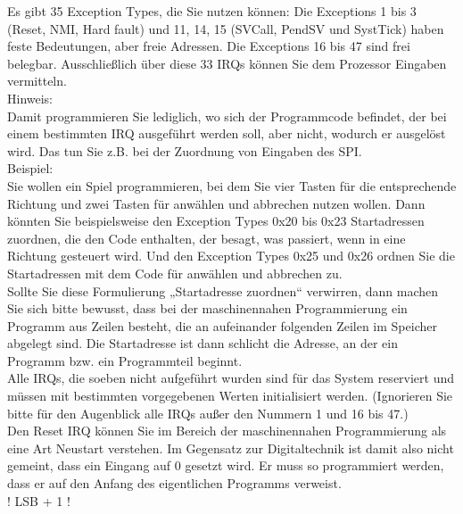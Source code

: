 Es gibt 35 Exception Types, die Sie nutzen können: Die Exceptions 1 bis 3 (Reset, NMI, Hard fault) und 11, 14, 15 (SVCall, PendSV und SystTick) haben feste Bedeutungen, aber freie Adressen. Die Exceptions 16 bis 47 sind frei belegbar. Ausschließlich über diese 33 IRQs können Sie dem Prozessor Eingaben vermitteln.\\

Hinweis: \\

Damit programmieren Sie lediglich, wo sich der Programmcode befindet, der bei einem bestimmten IRQ ausgeführt werden soll, aber nicht, wodurch er ausgelöst wird. Das tun Sie z.B. bei der Zuordnung von Eingaben des SPI.\\

Beispiel:\\

Sie wollen ein Spiel programmieren, bei dem Sie vier Tasten für die entsprechende Richtung und zwei Tasten für anwählen und abbrechen nutzen wollen. Dann könnten Sie beispielsweise den Exception Types 0x20 bis 0x23 Startadressen zuordnen, die den Code enthalten, der besagt, was passiert, wenn in eine Richtung gesteuert wird. Und den Exception Types 0x25 und 0x26 ordnen Sie die Startadressen mit dem Code für anwählen und abbrechen zu.\\

Sollte Sie diese Formulierung „Startadresse zuordnen“ verwirren, dann machen Sie sich bitte bewusst, dass bei der maschinennahen Programmierung ein Programm aus Zeilen besteht, die an aufeinander folgenden Zeilen im Speicher abgelegt sind. Die Startadresse ist dann schlicht die Adresse, an der ein Programm bzw. ein Programmteil beginnt.\\

Alle IRQs, die soeben nicht aufgeführt wurden sind für das System reserviert und müssen mit bestimmten vorgegebenen Werten initialisiert werden. (Ignorieren Sie bitte für den Augenblick alle IRQs außer den Nummern 1 und 16 bis 47.)\\

Den Reset IRQ können Sie im Bereich der maschinennahen Programmierung als eine Art Neustart verstehen. Im Gegensatz zur Digitaltechnik ist damit also nicht gemeint, dass ein Eingang auf 0 gesetzt wird. Er muss so programmiert werden, dass er auf den Anfang des eigentlichen Programms verweist. \\

! LSB + 1 ! \\

